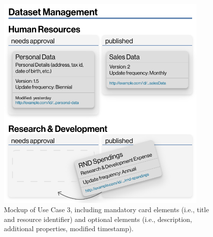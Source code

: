 \begin{figure}[H]
    \libertineLF
    \centering
    \includegraphics[width=105mm]{img/31-UseCase3.pdf}
	\caption[ Mockup of Use Case 3]{ Mockup of Use Case 3, including mandatory card elements (i.e., title and resource identifier) and optional elements (i.e., description, additional properties, modified timestamp).}
	\label{fig:RMB Use Case 3}
	\libertineOsF
\end{figure}








